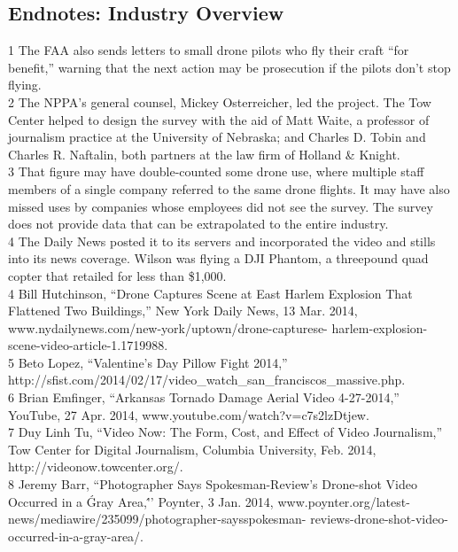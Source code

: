 \begin{itemize}
\section{Endnotes: Industry Overview}
1 The FAA also sends letters to small drone pilots who fly their craft ``for benefit,'' warning that the
next action may be prosecution if the pilots don't stop flying.\\
2 The NPPA's general counsel, Mickey Osterreicher, led the project. The Tow Center helped to
design the survey with the aid of Matt Waite, a professor of journalism practice at the University
of Nebraska; and Charles D. Tobin and Charles R. Naftalin, both partners at the law firm of
Holland & Knight.\\
3 That figure may have double-counted some drone use, where multiple staff members of a single
company referred to the same drone flights. It may have also missed uses by companies whose
employees did not see the survey. The survey does not provide data that can be extrapolated to the
entire industry.\\
4 The Daily News posted it to its servers and incorporated the video and
stills into its news coverage. Wilson was flying a DJI Phantom, a threepound
quad copter that retailed for less than \$1,000.\\
4 Bill Hutchinson, ``Drone Captures Scene at East Harlem Explosion That Flattened Two Buildings,''
New York Daily News, 13 Mar. 2014, www.nydailynews.com/new-york/uptown/drone-capturese-
harlem-explosion-scene-video-article-1.1719988.\\
5 Beto Lopez, ``Valentine's Day Pillow Fight 2014,'' http://sfist.com/2014/02/17/video_watch_san_franciscos_massive.php.\\
6 Brian Emfinger, ``Arkansas Tornado Damage Aerial Video 4-27-2014,'' YouTube, 27 Apr. 2014,
www.youtube.com/watch?v=c7s2lzDtjew.\\
7 Duy Linh Tu, ``Video Now: The Form, Cost, and Effect of Video Journalism,'' Tow Center for
Digital Journalism, Columbia University, Feb. 2014, http://videonow.towcenter.org/.\\
8 Jeremy Barr, ``Photographer Says Spokesman-Review's Drone-shot Video Occurred in a \'Gray Area,\'
'' Poynter, 3 Jan. 2014, www.poynter.org/latest-news/mediawire/235099/photographer-saysspokesman-
reviews-drone-shot-video-occurred-in-a-gray-area/.\\


\end{itemize}
